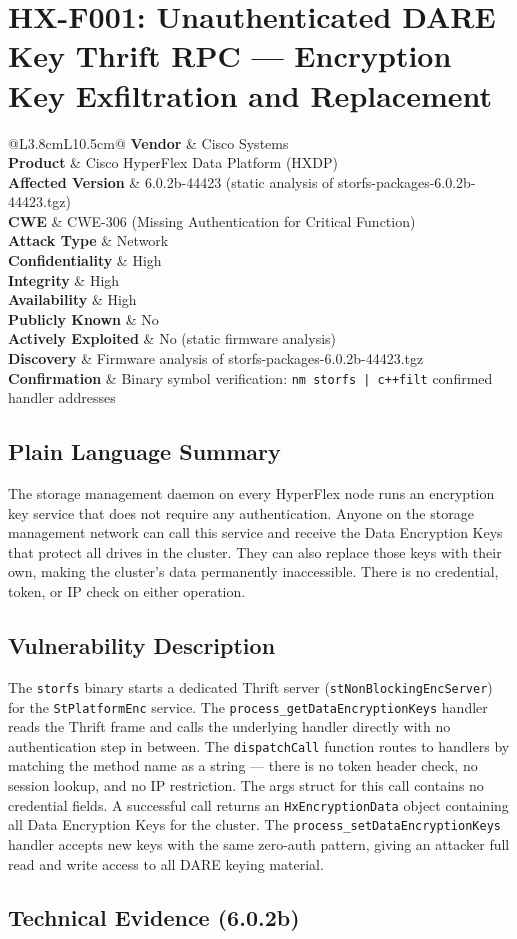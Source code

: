 \documentclass[11pt,a4paper]{article}
\makeatletter
\newcommand{\findingmeta}[9]{%
\begin{tabular}{@{}L{3.8cm}L{10.5cm}@{}}
\textbf{Vendor}             & Cisco Systems \\
\textbf{Product}            & Cisco HyperFlex Data Platform (HXDP) \\
\textbf{Affected Version}   & 6.0.2b-44423 (static analysis of storfs-packages-6.0.2b-44423.tgz) \\
\textbf{CWE}                & #1 \\
\textbf{Attack Type}        & #2 \\
\textbf{Confidentiality}    & #3 \\
\textbf{Integrity}          & #4 \\
\textbf{Availability}       & #5 \\
\textbf{Publicly Known}     & #6 \\
\textbf{Actively Exploited} & #7 \\
\textbf{Discovery}          & #8 \\
\textbf{Confirmation}       & #9 \\
\end{tabular}%
}
\makeatother
\begin{document}
\section{HX-F001: Unauthenticated DARE Key Thrift RPC --- Encryption Key Exfiltration and Replacement}

\findingmeta{CWE-306 (Missing Authentication for Critical Function)}{Network}{High}{High}{High}{No}{No (static firmware analysis)}{Firmware analysis of storfs-packages-6.0.2b-44423.tgz}{Binary symbol verification: \texttt{nm storfs | c++filt} confirmed handler addresses}

\subsection*{Plain Language Summary}

The storage management daemon on every HyperFlex node runs an encryption key
service that does not require any authentication. Anyone on the storage
management network can call this service and receive the Data Encryption Keys
that protect all drives in the cluster. They can also replace those keys with
their own, making the cluster's data permanently inaccessible. There is no
credential, token, or IP check on either operation.

\subsection*{Vulnerability Description}

The \texttt{storfs} binary starts a dedicated Thrift server
(\texttt{stNonBlockingEncServer}) for the \texttt{StPlatformEnc} service.
The \texttt{process\_getDataEncryptionKeys} handler reads the Thrift frame and
calls the underlying handler directly with no authentication step in between.
The \texttt{dispatchCall} function routes to handlers by matching the method
name as a string --- there is no token header check, no session lookup, and no
IP restriction. The args struct for this call contains no credential fields.
A successful call returns an \texttt{HxEncryptionData} object containing all
Data Encryption Keys for the cluster. The \texttt{process\_setDataEncryptionKeys}
handler accepts new keys with the same zero-auth pattern, giving an attacker full
read and write access to all DARE keying material.

\subsection*{Technical Evidence (6.0.2b)}
\end{document}
